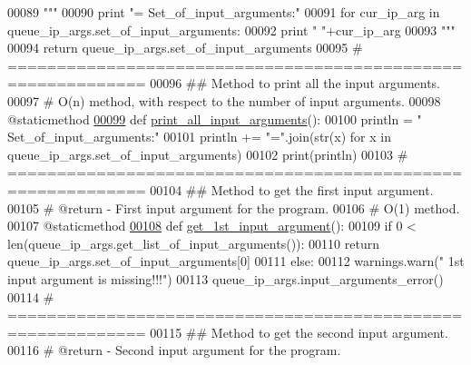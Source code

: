 \begin{DoxyCode}
00089         \textcolor{stringliteral}{"""}
00090 \textcolor{stringliteral}{        print "=    Set\_of\_input\_arguments:"}
00091 \textcolor{stringliteral}{        for cur\_ip\_arg in queue\_ip\_args.set\_of\_input\_arguments:}
00092 \textcolor{stringliteral}{            print " "+cur\_ip\_arg}
00093 \textcolor{stringliteral}{        """}
00094         \textcolor{keywordflow}{return} queue\_ip\_args.set\_of\_input\_arguments
00095     \textcolor{comment}{# ============================================================}
00096     \textcolor{comment}{##  Method to print all the input arguments.}
00097     \textcolor{comment}{#   O(n) method, with respect to the number of input arguments.}
00098     @staticmethod
\hypertarget{queue__ip__arguments_8py_source_l00099}{}\hyperlink{classutilities_1_1queue__ip__arguments_1_1queue__ip__args_a85480b443e2538123e8531852f9035c9}{00099}     \textcolor{keyword}{def }\hyperlink{classutilities_1_1queue__ip__arguments_1_1queue__ip__args_a85480b443e2538123e8531852f9035c9}{print\_all\_input\_arguments}():
00100         println = \textcolor{stringliteral}{"~    Set\_of\_input\_arguments:"}
00101         println += \textcolor{stringliteral}{"="}.join(str(x) \textcolor{keywordflow}{for} x \textcolor{keywordflow}{in} queue\_ip\_args.set\_of\_input\_arguments)
00102         print(println)
00103     \textcolor{comment}{# ============================================================}
00104     \textcolor{comment}{##  Method to get the first input argument.}
00105     \textcolor{comment}{#   @return - First input argument for the program.}
00106     \textcolor{comment}{#   O(1) method.}
00107     @staticmethod
\hypertarget{queue__ip__arguments_8py_source_l00108}{}\hyperlink{classutilities_1_1queue__ip__arguments_1_1queue__ip__args_a7b3c5efad539fadfb53eda0cfb8d3f03}{00108}     \textcolor{keyword}{def }\hyperlink{classutilities_1_1queue__ip__arguments_1_1queue__ip__args_a7b3c5efad539fadfb53eda0cfb8d3f03}{get\_1st\_input\_argument}():
00109         \textcolor{keywordflow}{if} 0 < len(queue\_ip\_args.get\_list\_of\_input\_arguments()):
00110             \textcolor{keywordflow}{return} queue\_ip\_args.set\_of\_input\_arguments[0]
00111         \textcolor{keywordflow}{else}:
00112             warnings.warn(\textcolor{stringliteral}{" 1st input argument is missing!!!"})
00113             queue\_ip\_args.input\_arguments\_error()
00114     \textcolor{comment}{# ============================================================}
00115     \textcolor{comment}{##  Method to get the second input argument.}
00116     \textcolor{comment}{#   @return - Second input argument for the program.}

\end{DoxyCode}
